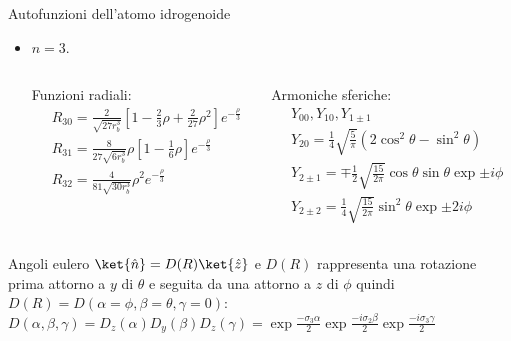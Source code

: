 \begin{frame}{Autofunzioni dell'atomo idrogenoide}
\begin{itemize}
\item $n=3$.
\begin{columns}
\begin{column}{0.5\textwidth}
Funzioni radiali:
\begin{align*}
&R_{30}=\frac{2}{\sqrt{27r_b^3}}[1-\frac{2}{3}\rho+\frac{2}{27}\rho^2]e^{-\frac{\rho}{3}}\\
&R_{31}=\frac{8}{27\sqrt{6r_b^3}}\rho [1-\frac{1}{6}\rho]e^{-\frac{\rho}{3}}\\
&R_{32}=\frac{4}{81\sqrt{30r_b^3}}\rho^2e^{-\frac{\rho}{3}}
\end{align*}
\end{column}
\begin{column}{0.5\textwidth}
Armoniche sferiche:
\begin{align*}
&Y_{00},Y_{10}, Y_{1\pm1}\\
&Y_{20}=\frac{1}{4}\sqrt{\frac{5}{\pi}}(2\cos^2{\theta}-\sin^2{\theta})\\
&Y_{2\pm1}=\mp\frac{1}{2}\sqrt{\frac{15}{2\pi}}\cos{\theta}\sin{\theta}\exp{\pm i\phi }\\
&Y_{2\pm2}=\frac{1}{4}\sqrt{\frac{15}{2\pi}}\sin^2{\theta}\exp{\pm2i\phi}
\end{align*}
\end{column}
\end{columns}
\end{itemize}

\end{frame}

\begin{frame}{Angoli eulero}
$\ket{\hat{n}}=D(R)\ket{\hat{z}}$ e $D(R)$ rappresenta una rotazione prima attorno a $y$ di $\theta$ e seguita da una attorno a $z$ di $\phi$ quindi $D(R)=D(\alpha=\phi,\beta=\theta,\gamma=0)$:\\
$D(\alpha, \beta, \gamma)=D_z(\alpha)D_y(\beta)D_z(\gamma)=\exp{\frac{-\sigma_3\alpha}{2}}\exp{\frac{-i\sigma_2\beta}{2}}\exp{\frac{-i\sigma_3\gamma}{2}}$
\end{frame}


